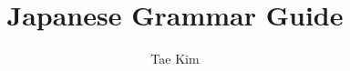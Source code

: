 \documentclass[a4paper,11pt,twoside]{report}
\title{Japanese Grammar Guide}
\author{Tae Kim}
\begin{document}
\tkbegin


\end{document}
